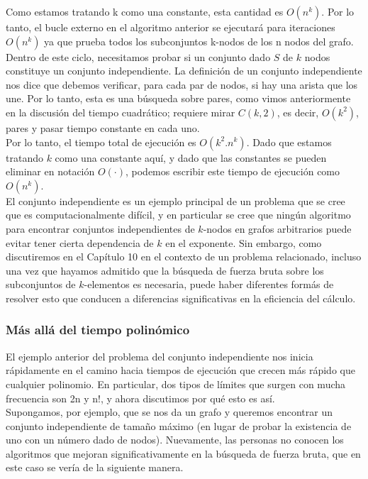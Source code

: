 \documentclass[a4paper, 12pt]{book}
\begin{document}
Como estamos tratando k como una constante, esta cantidad es $O(n^k)$. Por lo tanto, el bucle externo en el algoritmo anterior se ejecutará para iteraciones $O(n^k)$ ya que prueba todos los subconjuntos k-nodos de los n nodos del grafo.\\

Dentro de este ciclo, necesitamos probar si un conjunto dado $S$ de $k$ nodos constituye un conjunto independiente. La definición de un conjunto independiente nos dice que debemos verificar, para cada par de nodos, si hay una arista que los une. Por lo tanto, esta es una búsqueda sobre pares, como vimos anteriormente en la discusión del tiempo cuadrático; requiere mirar $C(k,2)$, es decir, $O(k^2)$, pares y pasar tiempo constante en cada uno.\\

Por lo tanto, el tiempo total de ejecución es $O(k^2.n^k)$. Dado que estamos tratando $k$ como una constante aquí, y dado que las constantes se pueden eliminar en notación $O(·)$, podemos escribir este tiempo de ejecución como $O(n^k)$.\\

El conjunto independiente es un ejemplo principal de un problema que se cree que es
computacionalmente difícil, y en particular se cree que ningún algoritmo para encontrar conjuntos independientes de $k$-nodos en grafos arbitrarios puede evitar tener cierta dependencia de $k$ en el exponente. Sin embargo, como discutiremos en el Capítulo 10 en el contexto de un problema relacionado, incluso una vez que hayamos admitido que la búsqueda de fuerza bruta sobre los subconjuntos de $k$-elementos es necesaria, puede haber diferentes formás de resolver esto que conducen a diferencias significativas en la eficiencia del cálculo.\\


\subsubsection*{Más allá del tiempo polinómico} 

El ejemplo anterior del problema del conjunto independiente nos inicia rápidamente en el camino hacia tiempos de ejecución que crecen más rápido que cualquier polinomio. En particular, dos tipos de límites que surgen con mucha frecuencia son 2n y n!, y ahora discutimos por qué esto es así.\\

Supongamos, por ejemplo, que se nos da un grafo y queremos encontrar un conjunto independiente de tamaño máximo (en lugar de probar la existencia de uno con un número dado de nodos). Nuevamente, las personas no conocen los algoritmos que mejoran significativamente en la búsqueda de fuerza bruta, que en este caso se vería de la siguiente manera.
 
\end{document}
